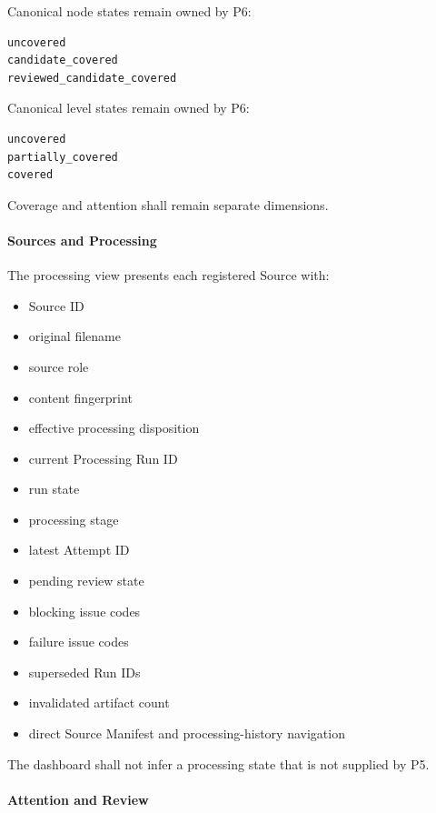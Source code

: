 Canonical node states remain owned by P6:

\begin{verbatim}
uncovered
candidate_covered
reviewed_candidate_covered
\end{verbatim}

Canonical level states remain owned by P6:

\begin{verbatim}
uncovered
partially_covered
covered
\end{verbatim}

Coverage and attention shall remain separate dimensions.

\hypertarget{sources-and-processing}{%
\paragraph{Sources and Processing}\label{sources-and-processing}}

The processing view presents each registered Source with:

\begin{itemize}
\tightlist
\item
  Source ID
\item
  original filename
\item
  source role
\item
  content fingerprint
\item
  effective processing disposition
\item
  current Processing Run ID
\item
  run state
\item
  processing stage
\item
  latest Attempt ID
\item
  pending review state
\item
  blocking issue codes
\item
  failure issue codes
\item
  superseded Run IDs
\item
  invalidated artifact count
\item
  direct Source Manifest and processing-history navigation
\end{itemize}

The dashboard shall not infer a processing state that is not supplied by P5.

\hypertarget{attention-and-review}{%
\paragraph{Attention and Review}\label{attention-and-review}}

